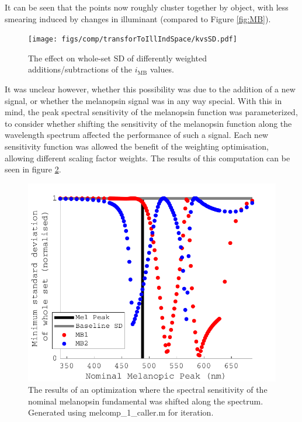 It can be seen that the points now roughly cluster together by object, with less smearing induced by changes in illuminant (compared to Figure \ref{fig:MB}).

\begin{figure}[htbp]
    \texttt{[image: figs/comp/transforToIllIndSpace/kvsSD.pdf]}
    \caption{The effect on whole-set SD of differently weighted additions/subtractions of the $i_{\text{MB}}$ values.}
    \label{fig:minSD}
\end{figure} 

It was unclear however, whether this possibility was due to the addition of a new signal, or whether the melanopsin signal was in any way special. With this in mind, the peak spectral sensitivity of the melanopsin function was parameterized, to consider whether shifting the sensitivity of the melanopsin function along the wavelength spectrum affected the performance of such a signal. Each new sensitivity function was allowed the benefit of the weighting optimisation, allowing different scaling factor weights. The results of this computation can be seen in figure \ref{fig:opt}. 

\begin{figure}[htbp]
    \includegraphics[max width=\textwidth]{figs/comp/melcomp_1_caller/opt.pdf}
    \caption{The results of an optimization where the spectral sensitivity of the nominal melanopsin fundamental was shifted along the spectrum. Generated using melcomp\_1\_caller.m for iteration.}
    \label{fig:opt}
\end{figure} 


